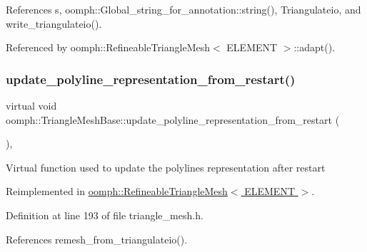 References s, oomph\+::\+Global\+\_\+string\+\_\+for\+\_\+annotation\+::string(), Triangulateio, and write\+\_\+triangulateio().



Referenced by oomph\+::\+Refineable\+Triangle\+Mesh$<$ E\+L\+E\+M\+E\+N\+T $>$\+::adapt().

\mbox{\label{classoomph_1_1TriangleMeshBase_ae822f78ce56d1ff9a3c06d7ec8bc2563}} 
\subsubsection{\texorpdfstring{update\+\_\+polyline\+\_\+representation\+\_\+from\+\_\+restart()}{update\_polyline\_representation\_from\_restart()}}
{\footnotesize\ttfamily virtual void oomph\+::\+Triangle\+Mesh\+Base\+::update\+\_\+polyline\+\_\+representation\+\_\+from\+\_\+restart (\begin{DoxyParamCaption}{ }\end{DoxyParamCaption})\hspace{0.3cm}{\ttfamily [inline]}, {\ttfamily [virtual]}}

Virtual function used to update the polylines representation after restart 

Reimplemented in \hyperlink{classoomph_1_1RefineableTriangleMesh_a26cdfda4b77158dd24641cb5889ad2ff}{oomph\+::\+Refineable\+Triangle\+Mesh$<$ E\+L\+E\+M\+E\+N\+T $>$}.



Definition at line 193 of file triangle\+\_\+mesh.\+h.



References remesh\+\_\+from\+\_\+triangulateio().

\mbox{\label{classoomph_1_1TriangleMeshBase_a69a2fe3d5e77ec39b9df4b3174b58c47}} 
